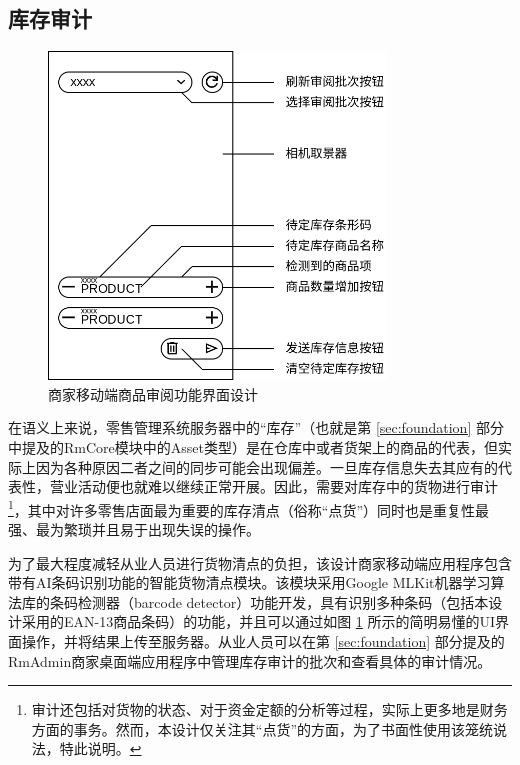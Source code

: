 \subsection{库存审计}

\begin{figure}[htbp]
	\centering
	\includegraphics[width=0.8\textwidth, height=0.3\textheight, keepaspectratio]{./imgs/se-audit.png}
	\caption{商家移动端商品审阅功能界面设计}
	\label{fig:se-audit}
\end{figure}

在语义上来说，零售管理系统服务器中的“库存”（也就是第 \ref{sec:foundation} 部分中提及的RmCore模块中的Asset类型）是在仓库中或者货架上的商品的代表，但实际上因为各种原因二者之间的同步可能会出现偏差。一旦库存信息失去其应有的代表性，营业活动便也就难以继续正常开展。因此，需要对库存中的货物进行审计\footnote{审计还包括对货物的状态、对于资金定额的分析等过程，实际上更多地是财务方面的事务。然而，本设计仅关注其“点货”的方面，为了书面性使用该笼统说法，特此说明。}，其中对许多零售店面最为重要的库存清点（俗称“点货”）同时也是重复性最强、最为繁琐并且易于出现失误的操作。

为了最大程度减轻从业人员进行货物清点的负担，该设计商家移动端应用程序包含带有AI条码识别功能的智能货物清点模块。该模块采用Google MLKit机器学习算法库的条码检测器（barcode detector）功能开发，具有识别多种条码（包括本设计采用的EAN-13商品条码）的功能，并且可以通过如图 \ref{fig:se-audit} 所示的简明易懂的UI界面操作，并将结果上传至服务器。从业人员可以在第 \ref{sec:foundation} 部分提及的RmAdmin商家桌面端应用程序中管理库存审计的批次和查看具体的审计情况。